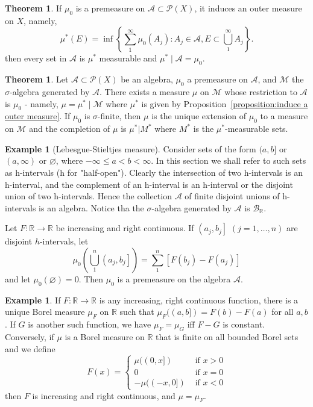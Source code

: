 \documentclass[12pt,a4paper]{book}
\theoremstyle{definition}
\newtheorem{theo}[defn]{Theorem}
\newtheorem{exam}[defn]{Example}
\begin{document}
\begin{theo}
    If $\mu_0$ is a premeasure on $\mathcal{A} \subset \mathcal{P}(X)$, it induces an outer measure on $X$, namely,
    $$
        \mu^*(E)=\inf \left\{\sum_1^{\infty} \mu_0\left(A_j\right): A_j \in \mathcal{A}, E \subset \bigcup_1^{\infty} A_j\right\} .
    $$
    then every set in $\mathcal{A}$ is $\mu^*$ measurable and  $\mu^* \mid \mathcal{A}=\mu_0$.
\end{theo}
\begin{theo}
    Let $\mathcal{A} \subset \mathcal{P}(X)$ be an algebra, $\mu_0$ a premeasure on $\mathcal{A}$, and $\mathcal{M}$ the $\sigma$-algebra generated by $\mathcal{A}$.
    There exists a measure $\mu$ on $\mathcal{M}$ whose restriction to $\mathcal{A}$ is $\mu_0$ - namely, $\mu=\mu^* \mid \mathcal{M}$ where $\mu^*$ is given by Proposition~\ref{proposition:induce a outer measure}.
    If $\mu_0$ is $\sigma$-finite, then $\mu$ is the unique extension of $\mu_0$ to a measure on $\mathcal{M}$ and the completion of $\mu$ is $\mu^*|M^*$ where $M^*$ is the $\mu^*$-measurable sets.
\end{theo}
\begin{exam}[Lebesgue-Stieltjes measure]
    Consider sets of the form $(a, b]$ or $(a, \infty)$ or $\varnothing$, where $-\infty \leq a<b<\infty$. In this section we shall refer to such sets as h-intervals (h for "half-open"). Clearly the intersection of two h-intervals is an h-interval, and the complement of an h-interval is an h-interval or the disjoint union of two h-intervals.
    Hence the collection $\mathcal{A}$ of finite disjoint unions of $\mathrm{h}$-intervals is an algebra.
    Notice tha the $\sigma$-algebra generated by $\mathcal{A}$ is $\mathcal{B}_{\mathbb{R}}$.

    Let $F: \mathbb{R} \rightarrow \mathbb{R}$ be increasing and right continuous. If $\left(a_j, b_j\right]$ $(j=1, \ldots, n)$ are disjoint $h$-intervals, let
    $$
        \mu_0\left(\bigcup_1^n\left(a_j, b_j\right]\right)=\sum_1^n\left[F\left(b_j\right)-F\left(a_j\right)\right]
    $$
    and let $\mu_0(\varnothing)=0$. Then $\mu_0$ is a premeasure on the algebra $\mathcal{A}$.
\end{exam}
\begin{exam}
    If $F: \mathbb{R} \rightarrow \mathbb{R}$ is any increasing, right continuous function, there is a unique Borel measure $\mu_F$ on $\mathbb{R}$ such that $\mu_F((a, b])=F(b)-F(a)$ for all $a, b$. If $G$ is another such function, we have $\mu_F=\mu_G$ iff $F-G$ is constant. Conversely, if $\mu$ is a Borel measure on $\mathbb{R}$ that is finite on all bounded Borel sets and we define
    $$
        F(x)= \begin{cases}\mu((0, x]) & \text { if } x>0 \\ 0 & \text { if } x=0 \\ -\mu((-x, 0]) & \text { if } x<0\end{cases}
    $$
    then $F$ is increasing and right continuous, and $\mu=\mu_F$.
\end{exam}
\end{document}
